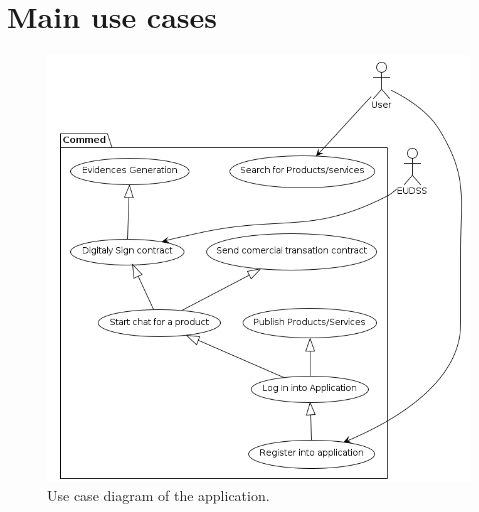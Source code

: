 \documentclass[./main.tex]{subfiles}
\begin{document}
\section{Main use cases}

\begin{figure}[h]
\centering
\includegraphics[width=\linewidth]{use_case_diagram/usecase_diagram.png}
\caption{Use case diagram of the application.}
\end{figure}
\end{document}
